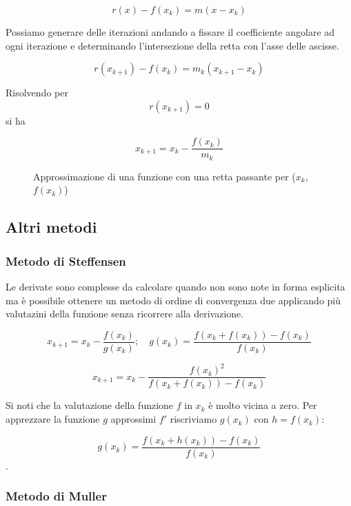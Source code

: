 \documentclass[12pt]{article}
\theoremstyle{plain}%
\theoremstyle{definition}
\theoremstyle{remark}
\begin{document}
$$r(x) - f(x_k) = m (x - x_k)$$

Possiamo generare delle iterazioni andando a fissare il coefficiente angolare ad ogni iterazione e determinando l'intersezione della retta con l'asse delle ascisse.

$$r(x_{k+1}) - f(x_k) = m_k (x_{k+1} - x_k)$$

Risolvendo per $$r(x_{k+1}) = 0$$ si ha

\begin{equation}
    x_{k+1} = x_k - \frac{f(x_k)}{m_k}
\end{equation}

\begin{figure}
    \begin{center}
        
        \caption{Approssimazione di una funzione con una retta passante per ($x_k$, $f(x_k)$)}
        \label{fig:retta_approx}
    \end{center}
\end{figure}







\subsection{Altri metodi}

\subsubsection{Metodo di Steffensen}

Le derivate sono complesse da calcolare quando non sono
note in forma esplicita ma è possibile ottenere un metodo
di ordine di convergenza due applicando più valutazini della funzione
senza ricorrere alla derivazione.

$$x_{k+1} = x_k -\frac{f(x_k)}{g(x_k)};\quad g(x_k) =\frac{f(x_k + f(x_k )) - f(x_k )}{f(x_k)}$$

$$x_{k+1} = x_k - \frac{f(x_k)^2}{f(x_k + f(x_k )) - f(x_k )}$$

Si noti che la valutazione della funzione $f$ in $x_k$ è molto vicina a zero.
Per apprezzare la funzione $g$ approssimi $f'$ riscriviamo $g(x_k)$ con
$h = f(x_k)$:

$$g(x_k) =\frac{f(x_k + h(x_k )) - f(x_k )}{f(x_k)}$$.

\subsubsection{Metodo di Muller}
\end{document}
